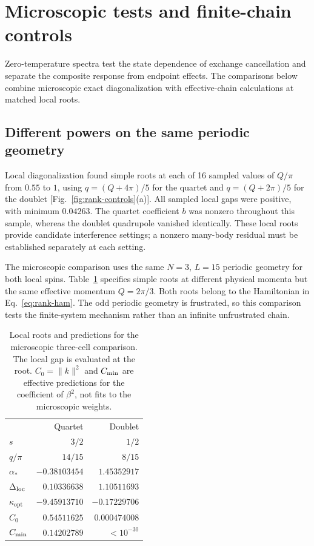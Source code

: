 \section{Microscopic tests and finite-chain controls}
\label{app:ground-controls}

Zero-temperature spectra test the state dependence of exchange
cancellation and separate the composite response from endpoint effects.
The comparisons below combine microscopic exact diagonalization with
effective-chain calculations at matched local roots.

\subsection{Different powers on the same periodic geometry}

Local diagonalization found simple roots at each of 16 sampled values
of $Q/\pi$ from $0.55$ to $1$, using $q=(Q+4\pi)/5$ for the quartet
and $q=(Q+2\pi)/5$ for the doublet [Fig.~\ref{fig:rank-controls}(a)].
All sampled local gaps were positive, with minimum $0.04263$.
The quartet coefficient $b$ was nonzero throughout this sample,
whereas the doublet quadrupole vanished identically.
These local roots provide candidate interference settings; a nonzero
many-body residual must be established separately at each setting.

The microscopic comparison uses the same $N=3$, $L=15$ periodic
geometry for both local spins. Table~\ref{tab:rank-roots} specifies simple
roots at different physical momenta but the same effective momentum
$Q=2\pi/3$. Both roots belong to the Hamiltonian in
Eq.~\eqref{eq:rank-ham}.
The odd periodic geometry is frustrated, so this comparison tests the
finite-system mechanism rather than an infinite unfrustrated chain.

\begin{table}[!t]
\caption{Local roots and predictions for the microscopic three-cell comparison.
The local gap is evaluated at the root. $C_0=\|k\|^2$ and $C_{\mathrm{min}}$ are
effective predictions for the coefficient of $\beta^2$, not fits to the
microscopic weights.}
\label{tab:rank-roots}
\begin{ruledtabular}
\begin{tabular}{lrr}
 & Quartet & Doublet\\
$s$ & $3/2$ & $1/2$\\
$q/\pi$ & $14/15$ & $8/15$\\
$\alpha_*$ & $-0.38103454$ & $1.45352917$\\
$\Delta_{\mathrm{loc}}$ & $0.10336638$ & $1.10511693$\\
$\kappa_{\mathrm{opt}}$ & $-9.45913710$ & $-0.17229706$\\
$C_0$ & $0.54511625$ & $0.000474008$\\
$C_{\mathrm{min}}$ & $0.14202789$ & $<10^{-30}$\\
\end{tabular}
\end{ruledtabular}
\end{table}

